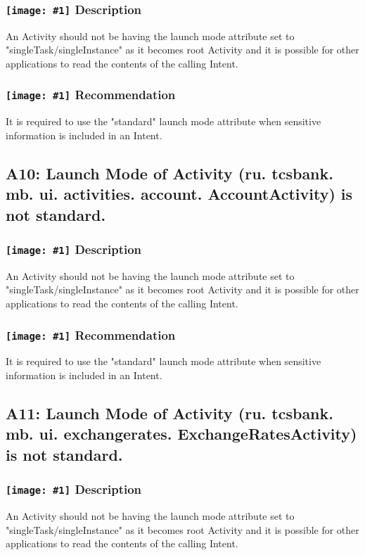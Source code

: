 \documentclass[12p]{article}
\newcommand{\icon}[1]{\texttt{[image: \#1]}}
\begin{document}
\subsubsection*{\protect\icon{/home/miki/Documents/GITHUB/AndroidPermissions/python/vulns/report_icons/basic_sheet.png} Description}
An Activity should not be having the launch mode attribute set to "singleTask/singleInstance" as it becomes root Activity and it is possible for other applications to read the contents of the calling Intent.
\subsubsection*{\protect\icon{/home/miki/Documents/GITHUB/AndroidPermissions/python/vulns/report_icons/basic_todo.png} Recommendation}
It is required to use the "standard" launch mode attribute when sensitive information is included in an Intent.
\subsection{A10: Launch Mode of Activity (ru. tcsbank. mb. ui. activities. account. AccountActivity) is not standard.}
\subsubsection*{\protect\icon{/home/miki/Documents/GITHUB/AndroidPermissions/python/vulns/report_icons/basic_sheet.png} Description}
An Activity should not be having the launch mode attribute set to "singleTask/singleInstance" as it becomes root Activity and it is possible for other applications to read the contents of the calling Intent.
\subsubsection*{\protect\icon{/home/miki/Documents/GITHUB/AndroidPermissions/python/vulns/report_icons/basic_todo.png} Recommendation}
It is required to use the "standard" launch mode attribute when sensitive information is included in an Intent.
\subsection{A11: Launch Mode of Activity (ru. tcsbank. mb. ui. exchangerates. ExchangeRatesActivity) is not standard.}
\subsubsection*{\protect\icon{/home/miki/Documents/GITHUB/AndroidPermissions/python/vulns/report_icons/basic_sheet.png} Description}
An Activity should not be having the launch mode attribute set to "singleTask/singleInstance" as it becomes root Activity and it is possible for other applications to read the contents of the calling Intent.
\end{document}
